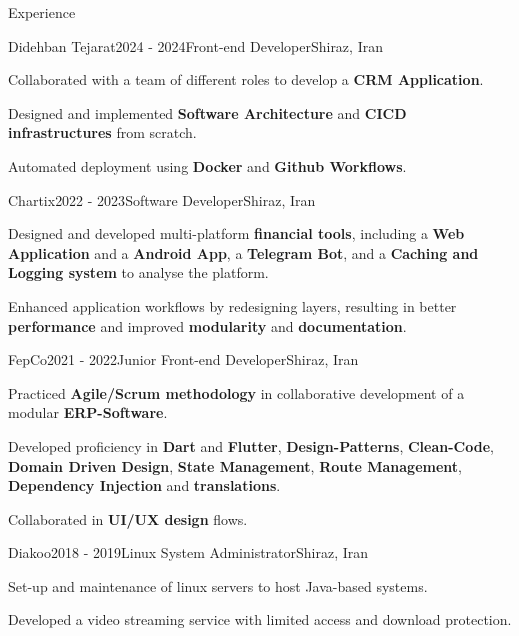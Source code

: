 \documentclass[
	a4paper, %
	12pt, %
]{resume} %
\begin{document}
\begin{rSection}{Experience}
\bigskip

	\begin{rSubsection}{Didehban Tejarat}{2024 - 2024}{Front-end Developer}{Shiraz, Iran}
		\item Collaborated with a team of different roles to develop a \textbf{CRM Application}.
		\item Designed and implemented \textbf{Software Architecture} and \textbf{CICD infrastructures} from scratch.
        \item Automated deployment using \textbf{Docker} and \textbf{Github Workflows}.
        \\      
	\end{rSubsection}

	\begin{rSubsection}{Chartix}{2022 - 2023}{Software Developer}{Shiraz, Iran}
        \item Designed and developed multi-platform \textbf{financial tools}, including a \textbf{Web Application} and a \textbf{Android App}, a \textbf{Telegram Bot}, and a \textbf{Caching and Logging system} to analyse the platform. 
        \item Enhanced application workflows by redesigning layers, resulting in better \textbf{performance} and improved \textbf{modularity} and \textbf{documentation}.
        \break {}      
	\end{rSubsection}
\bigskip

	\begin{rSubsection}{FepCo}{2021 - 2022}{Junior Front-end Developer}{Shiraz, Iran}
	   	\item Practiced \textbf{Agile/Scrum methodology} in collaborative development of a modular \textbf{ERP-Software}.
        \item Developed proficiency in \textbf{Dart} and \textbf{Flutter}, \textbf{Design-Patterns}, \textbf{Clean-Code},  \textbf{Domain Driven Design}, \textbf{State Management}, \textbf{Route Management}, \textbf{Dependency Injection} and \textbf{translations}.
		\item Collaborated in \textbf{UI/UX design} flows.
        \break {}    
	\end{rSubsection}
\bigskip
	\begin{rSubsection}{Diakoo}{2018 - 2019}{Linux System Administrator}{Shiraz, Iran}
		\item Set-up and maintenance of linux servers to host Java-based systems.
		\item Developed a video streaming service with limited access and download protection.
	\end{rSubsection}
\bigskip
\end{rSection}
\end{document}
